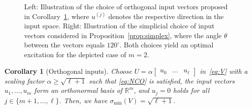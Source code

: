 \documentclass[a4paper, reqno]{amsart}
\newcommand{\R}{\ensuremath{\mathbb R}}
\newcommand{\dd}{\ell}
\newtheorem{corollary}[theorem]{Corollary}
\begin{document}
\begin{figure}[htb]
\begin{minipage}[b]{0.49\textwidth}
    \end{minipage}
    \vspace{-1em}
    \caption{Left: Illustration of the choice of orthogonal input vectors proposed in Corollary~\ref{cor:scaling}, where $u^{(j)}$ denotes the respective direction in the input space. 
    Right: Illustration of the simplicial choice of input vectors considered in Proposition~\ref{prop:simplex}, where the angle $\theta$ between the vectors equals $120^\circ$.
    Both choices yield an optimal excitation for the depicted case of $m=2$.}
    \label{fig:scaling}
\end{figure}
\begin{corollary}[Orthogonal inputs]\label{cor:scaling}
    Choose $U=\alpha\begin{bmatrix}
        u_0&\dots&u_\dd
    \end{bmatrix}$ in~\cref{eq:V} with a scaling factor $\alpha\geq\sqrt{\dd+1}$ such that \eqref{eq:NCO} is satisfied, %
    the input vectors $u_1,\dots,u_m$ form an orthonormal basis of $\R^m$, and $u_j=0$ holds for all $j \in \{m+1,\ldots,\dd\}$.
    Then, we have $\sigma_\mathrm{min}(V)=\sqrt{\dd+1}$.
\end{corollary}
\end{document}
